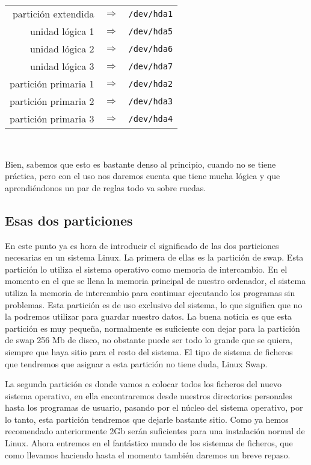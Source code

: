 \begin{center}
\begin{tabular}{rcl}
partición extendida & $\Rightarrow$ & {\tt /dev/hda1} \\
unidad lógica 1 & $\Rightarrow$ & {\tt /dev/hda5} \\
unidad lógica 2 & $\Rightarrow$ & {\tt /dev/hda6} \\
unidad lógica 3 & $\Rightarrow$ & {\tt /dev/hda7} \\
partición primaria 1 & $\Rightarrow$ & {\tt /dev/hda2} \\
partición primaria 2 & $\Rightarrow$ & {\tt /dev/hda3} \\
partición primaria 3 & $\Rightarrow$ & {\tt /dev/hda4} \\
\end{tabular}\\
\end{center}

Bien, sabemos  que esto es  bastante denso  al principio, cuando  no se
tiene práctica,  pero con el  uso nos  daremos cuenta que  tiene mucha
lógica y que aprendiéndonos un par de reglas todo va sobre ruedas.


\subsection{Esas dos particiones}

En  este punto  ya es  hora de  introducir el  significado de  las dos
particiones necesarias en un sistema Linux.  La primera de ellas es la
partición de swap. Esta partición lo utiliza el sistema operativo como
memoria de  intercambio. En el momento  en el que se  llena la memoria
principal  de nuestro  ordenador,  el sistema  utiliza  la memoria  de
intercambio  para continuar  ejecutando los  programas sin  problemas.
Esta partición es  de uso exclusivo del sistema, lo  que significa que
no la podremos  utilizar para guardar nuestro datos.  La buena noticia
es que  esta partición es  muy pequeña, normalmente es  suficiente con
dejar para la partición de swap 256 Mb de disco, no obstante puede ser
todo lo grande que se quiera, siempre que haya sitio para el resto del
sistema. El  tipo de sistema de  ficheros que tendremos que  asignar a
esta partición no tiene duda, Linux Swap.

La  segunda partición  es donde  vamos  a colocar  todos los  ficheros
del  nuevo sistema  operativo,  en ella  encontraremos desde  nuestros
directorios personales hasta los programas  de usuario, pasando por el
núcleo del sistema  operativo, por lo tanto,  esta partición tendremos
que dejarle  bastante sitio.  Como ya hemos  recomendado anteriormente
2Gb  serán suficientes  para una  instalación normal  de Linux.  Ahora
entremos en el fantástico mundo de  los sistemas de ficheros, que como
llevamos haciendo hasta el momento también daremos un breve repaso.

